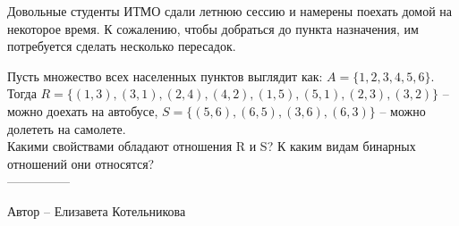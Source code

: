\question
Довольные студенты ИТМО сдали летнюю сессию и намерены поехать домой на некоторое время. К сожалению, чтобы добраться до пункта назначения, им потребуется сделать несколько пересадок.

Пусть множество всех населенных пунктов выглядит как: $A = \{1, 2, 3, 4, 5, 6\}$.
\\
Тогда $R = \{(1, 3), (3, 1), (2, 4), (4, 2), (1, 5), (5, 1), (2, 3), (3, 2)\}$ -- можно доехать на автобусе, $S = \{(5, 6), (6, 5), (3, 6), (6, 3)\}$ -- можно долететь на самолете.
\\
Какими свойствами обладают отношения R и S? К каким видам бинарных отношений они относятся?
\\
---------------

Автор -- Елизавета Котельникова
